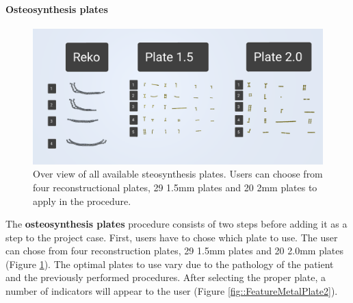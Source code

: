\paragraph{Osteosynthesis plates}

\begin{figure}[ht]
    \centering
    \includegraphics[width=\linewidth]{images/implementation/features/procedures/osteo_overview.png}
    \caption{\label{fig::FeatureMetalPlate} Over view of all available steosynthesis plates. Users can choose from four reconstructional plates, 29 1.5mm plates and 20 2mm plates to apply in the procedure.}
\end{figure}

The \textbf{osteosynthesis plates} procedure consists of two steps before adding it as a step to the project case.
First, users have to chose which plate to use.
The user can chose from four reconstruction plates, 29 1.5mm plates and 20 2.0mm plates (Figure \ref{fig::FeatureMetalPlate}).
The optimal plates to use vary due to the pathology of the patient and the previously performed procedures.
After selecting the proper plate, a number of indicators will appear to the user (Figure \ref{fig::FeatureMetalPlate2}).

